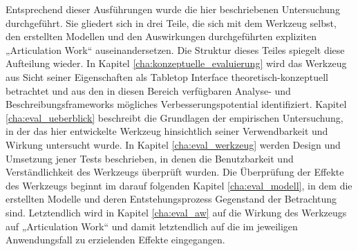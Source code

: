 Entsprechend dieser Ausführungen wurde die hier beschriebenen Untersuchung durchgeführt. Sie gliedert sich in drei Teile, die sich mit dem Werkzeug selbst, den erstellten Modellen und den Auswirkungen durchgeführten expliziten „Articulation Work“ auseinandersetzen. Die Struktur dieses Teiles spiegelt diese Aufteilung wieder. In Kapitel \ref{cha:konzeptuelle_evaluierung} wird das Werkzeug aus Sicht seiner Eigenschaften als Tabletop Interface theoretisch-konzeptuell betrachtet und aus den in diesen Bereich verfügbaren Analyse- und Beschreibungsframeworks mögliches Verbesserungspotential identifiziert. Kapitel \ref{cha:eval_ueberblick} beschreibt die Grundlagen der empirischen Untersuchung, in der das hier entwickelte Werkzeug hinsichtlich seiner Verwendbarkeit und Wirkung untersucht wurde. In Kapitel \ref{cha:eval_werkzeug} werden Design und Umsetzung jener Tests beschrieben, in denen die Benutzbarkeit und Verständlichkeit des Werkzeugs überprüft wurden. Die Überprüfung der Effekte des Werkzeugs beginnt im darauf folgenden Kapitel \ref{cha:eval_modell}, in dem die erstellten Modelle und deren Entstehungsprozess Gegenstand der Betrachtung sind. Letztendlich wird in Kapitel \ref{cha:eval_aw} auf die Wirkung des Werkzeugs auf „Articulation Work“ und damit letztendlich auf die im jeweiligen Anwendungsfall zu erzielenden Effekte eingegangen.











%
%

